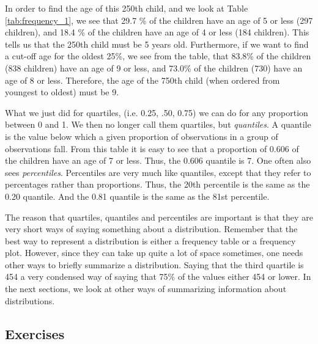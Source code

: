 In order to find the age of this 250th child, and we look at Table \ref{tab:frequency_1}, we see that 29.7 \% of the children have an age of 5 or less (297 children), and 18.4 \% of the children have an age of 4 or less (184 children). This tells us that the 250th child must be 5 years old. Furthermore, if we want to find a cut-off age for the oldest 25\%, we see from the table, that 83.8\% of the children (838 children) have an age of 9 or less, and 73.0\% of the children (730) have an age of 8 or less. Therefore, the age of the 750th child (when ordered from youngest to oldest) must be 9.


What we just did for quartiles, (i.e. 0.25, .50, 0.75) we can do for any proportion between 0 and 1. We then no longer call them quartiles, but \textit{quantiles}. A quantile is the value below which a given proportion of observations in a group of observations fall. From this table it is easy to see that a proportion of 0.606 of the children have an age of 7 or less. Thus, the 0.606 quantile is 7. One often also sees \textit{percentiles}. Percentiles are very much like quantiles, except that they refer to percentages rather than proportions. Thus, the 20th percentile is the same as the 0.20 quantile. And the 0.81 quantile is the same as the 81st percentile.

The reason that quartiles, quantiles and percentiles are important is that they are very short ways of saying something about a distribution. Remember that the best way to represent a distribution is either a frequency table or a frequency plot. However, since they can take up quite a lot of space sometimes, one needs other ways to briefly summarize a distribution. Saying that the third quartile is 454 a very condensed way of saying that 75\% of the values either 454 or lower. In the next sections, we look at other ways of summarizing information about distributions.

\subsection{Exercises}

\begin{kframe}


{\ttfamily\noindent\bfseries{}}\end{kframe}

